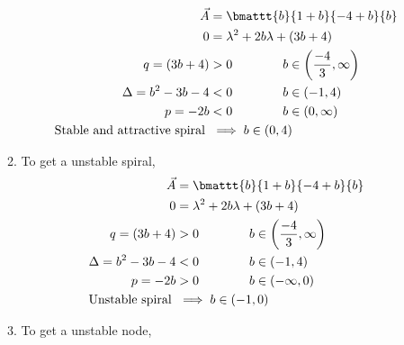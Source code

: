 \begin{enumerate}
\begin{enumerate}
                    \begin{align}
                        \vec{A}                               &
                        = \bmattt{b}{1+b}{-4+b}{b}                                \\
                        0                                     &
                        = \lambda^{2} + 2b\lambda + (3b + 4)                      \\
                        q = (3b+4)                            & > 0 \qquad \qquad
                        b \in \left( \frac{-4}{3}, \infty \right)                 \\
                        \Delta = b^2 - 3b - 4                 & < 0 \qquad\qquad
                        b \in (-1, 4)                                             \\
                        p = -2b                               & < 0 \qquad\qquad
                        b \in (0, \infty)                                         \\
                        \text{Stable and attractive spiral}\  & \implies b \in
                        (0, 4)
                    \end{align}
              \item To get a unstable spiral,
                    \begin{align}
                        \vec{A}                  & = \bmattt{b}{1+b}{-4+b}{b} \\
                        0                        & = \lambda^{2} + 2b\lambda
                        + (3b + 4)                                            \\
                        q = (3b+4)               & > 0 \qquad \qquad
                        b \in \left( \frac{-4}{3}, \infty \right)             \\
                        \Delta = b^2 - 3b - 4    & < 0 \qquad\qquad
                        b \in (-1, 4)                                         \\
                        p = -2b                  & > 0 \qquad\qquad
                        b \in (-\infty, 0)                                    \\
                        \text{Unstable spiral}\  & \implies b \in
                        (-1, 0)
                    \end{align}
              \item To get a unstable node,
                    \begin{align}

\end{align}
\end{enumerate}
\end{enumerate}
